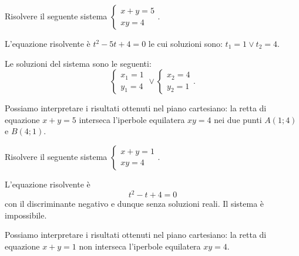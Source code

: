 \begin{esempio}
Risolvere il seguente sistema 
\(\left\{\begin{array}{l}{x+y=5}\\{xy=4}\end{array}\right.\).
\begin{multicols}{2}
L'equazione risolvente è \(t^2-5t+4=0\) le cui soluzioni sono: \(t_1=1\vee t_2=4\).

Le soluzioni del sistema sono le seguenti: \[ 
\left\{\begin{array}{l}{x_1=1}\\{y_1=4}\end{array}\right.\vee 
\left\{\begin{array}{l}{x_2=4}\\{y_2=1}\end{array}\right.. \]

Possiamo interpretare i risultati ottenuti nel piano cartesiano: la retta di 
equazione \(x+y=5\) interseca l'iperbole equilatera \({xy}=4\) nei due punti 
\(A(1;4)\) e \(B(4;1)\).
\begin{center}

\end{center}
\end{multicols}
\end{esempio}

\begin{esempio}
Risolvere il seguente sistema 
\(\left\{\begin{array}{l}{x+y=1}\\{xy=4}\end{array}\right.\).
\begin{multicols}{2}
L'equazione risolvente è \[ t^2-t+4=0 \] con il discriminante negativo e dunque 
senza soluzioni reali. Il sistema è impossibile.

Possiamo interpretare i risultati ottenuti nel piano cartesiano: la retta di 
equazione \(x+y=1\) non interseca l'iperbole equilatera \({xy}=4\).
\begin{center}

\end{center}
\end{multicols}
\end{esempio}

